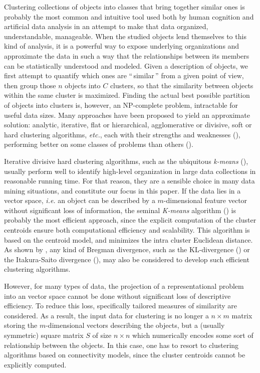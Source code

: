 \documentclass[10pt,journal,compsoc]{IEEEtran}
\newcommand{\gl}[1]{``\,#1\,''} %
\begin{document}
Clustering collections of objects into classes that bring together similar ones is probably the most common and intuitive tool used both by human cognition and artificial data analysis in an attempt to make that data organized, understandable, manageable. When the studied objects lend themselves to this kind of analysis, it is a powerful way to expose underlying organizations and approximate the data in such a way that the relationships between its members can be statistically understood and modeled. Given a description of objects, we first attempt to quantify which ones are \gl{similar} from a given point of view, then group those $n$ objects into $C$ clusters, so that the similarity between objects within the same cluster is maximized. Finding the actual best possible partition of objects into clusters is, however, an NP-complete problem, intractable for useful data sizes. Many approaches have been proposed to yield an approximate solution: analytic, iterative, flat or hierarchical, agglomerative or divisive, soft or hard clustering algorithms, \textit{etc.}, each with their strengths and weaknesses (\cite{jain2010data}), performing better on some classes of problems than others (\cite{steinbach2000comparison,thalamuthu2006evaluation}).

Iterative divisive hard clustering algorithms, such as the ubiquitous \emph{k-means} (\cite{macQueenBsmsp67}), usually perform well to identify high-level organization in large data collections in reasonable running time. For that reason, they are a sensible choice in many data mining situations, and constitute our focus in this paper.
If the data lies in a vector space, \textit{i.e.} an object can be described by a $m$-dimensional feature vector without significant loss of information, the seminal \emph{K-means} algorithm (\cite{macQueenBsmsp67}) is probably the most efficient approach, since the explicit computation of the cluster centroids ensure both computational efficiency and scalability. This algorithm is  based on the centroid model, and minimizes the intra cluster Euclidean distance. As shown by \cite{Banerjee:2005:CBD:1046920.1194902}, any kind of Bregman divergence, such as the KL-divergence (\cite{Dhillon:2003:DIT:944919.944973}) or the Itakura-Saito divergence (\cite{linde:algorithm}), may also be considered to develop such efficient clustering algorithms.

However, for many types of data, the projection of a representational problem into an vector space cannot be done without significant loss of descriptive efficiency. To reduce this loss, specifically tailored measures of similarity are considered. As a result, the input data for clustering is no longer a $n \times m$ matrix storing the $m$-dimensional vectors describing the objects, but a (usually symmetric) square matrix $S$ of size $n \times n$ which numerically encodes some sort of relationship between the objects. In this case, one has to resort to clustering algorithms based on connectivity models, since the cluster centroids cannot be explicitly computed.
\end{document}
